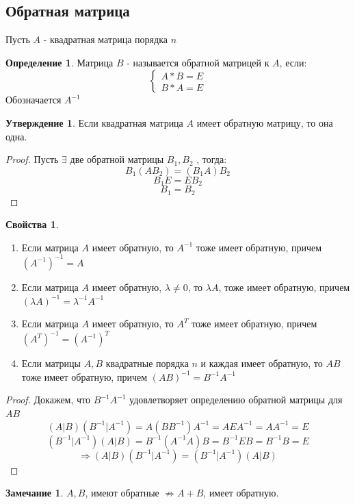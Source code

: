 \documentclass[a4paper, 12pt]{article}
\newcommand\tab[1][.5cm]{\hspace*{#1}}
\theoremstyle{definition}
\newtheorem*{definition}{Определение}
\newtheorem*{subtheorem}{Утверждение}
\newtheorem*{remark}{Замечание}
\newtheorem*{properties}{Свойства}
\begin{document}
  \subsection{Обратная матрица}
  Пусть $A$ - квадратная матрица порядка $n$ 
  \begin{definition}
    Матрица $B$ - называется обратной матрицей к $A$, если:
    $$\begin{cases}
      A * B = E \\
      B * A = E
    \end{cases}$$
    Обозначается $A^{-1}$ 
  \end{definition} 
  \begin{subtheorem}
    Если квадратная матрица $A$ имеет обратную матрицу, то она одна. 
  \end{subtheorem} 
  \begin{proof}
    Пусть $\exists $ две обратной матрицы $B_1, B_2$ , тогда: 
    $$B_1(AB_2) = (B_1A)B_2$$ 
    $$B_1 E = E B_2$$
    $$B_1 = B_2$$  
  \end{proof} 
  \begin{properties}  \tab
    \begin{enumerate}
      \item Если матрица $A$ имеет обратную, то $A^{-1}$ тоже имеет обратную, причем \\$(A^{-1})^{-1} = A$ \label{pro1} 
      \item Если матрица $A$ имеет обратную, $\lambda \not =0$, то $\lambda A$, тоже имеет обратную, причем $(\lambda A)^{-1} = \lambda^{-1} A^{-1}$ 
      \item Если матрица $A$ имеет обратную, то $A^{T}$ тоже имеет обратную, причем \\$(A^{T})^{-1} = (A^{-1})^{T}$
      \item Если матрицы $A,B$ квадратные порядка $n$ и каждая имеет обратную, то $AB$ тоже имеет обратную, причем $(AB)^{-1} = B^{-1}A^{-1}$ \label{pro4} 
    \end{enumerate}
  \end{properties}
  \begin{proof}
    Докажем, что $B^{-1} A^{-1} $ удовлетворяет определению обратной матрицы для $AB$ 
    $$(A|B)(B^{-1}|A^{-1}) = A(BB^{-1})A^{-1} = AEA^{-1} = AA^{-1} = E$$
    $$(B^{-1}|A^{-1})(A|B) = B^{-1}(A^{-1}A)B = B^{-1}EB = B^{-1}B=E$$  
    $$\Longrightarrow (A|B)(B^{-1}|A^{-1}) = (B^{-1}|A^{-1})(A|B)$$ 
  \end{proof} 
  \begin{remark}
    $A,B$, имеют обратные $\not \Rightarrow A+B$, имеет обратную.
  \end{remark} 
\end{document}
